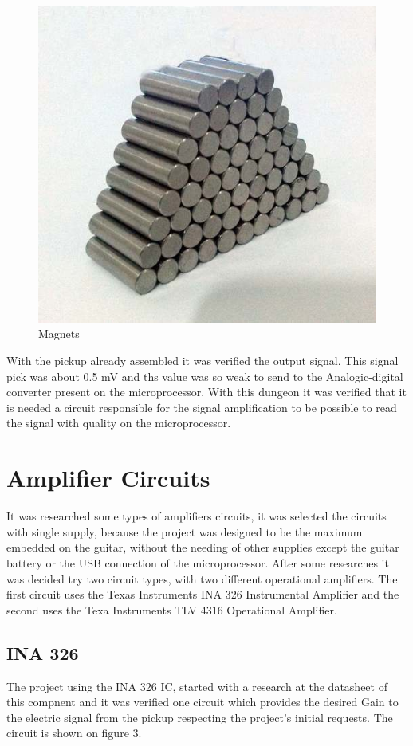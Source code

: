 \begin{figure}[!htpb]
\centering
\includegraphics[scale=0.3]{textual-elements/hardware/ima}
\caption{Magnets}
\end{figure}

With the pickup already assembled it was verified the output signal. This signal pick was about 0.5 mV and ths value was so weak to send to the Analogic-digital converter present on the microprocessor. With this dungeon it was verified that it is needed a circuit responsible for the signal amplification to be possible to read the signal with quality on the microprocessor. 

\section{Amplifier Circuits}
It was researched some types of amplifiers circuits, it was selected the circuits with single supply, because the project was designed to be the maximum embedded on the guitar, without the needing of other supplies except the guitar battery or the USB connection of the microprocessor.
After some researches it was decided try two circuit types, with two different operational amplifiers. The first circuit uses the Texas Instruments INA 326 Instrumental Amplifier and the second uses the Texa Instruments TLV 4316 Operational Amplifier.

\subsection{INA 326}
The project using the INA 326 IC, started with a research at the datasheet of this compnent and it was verified one circuit which provides the desired Gain to the electric signal from the pickup respecting the project's initial requests. The circuit is shown on figure 3. 

